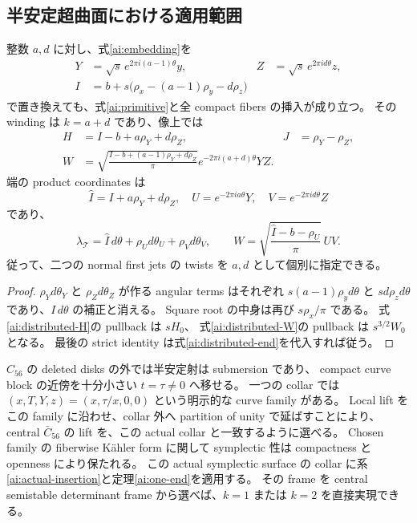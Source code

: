 \subsection{半安定超曲面における適用範囲}

\begin{proposition}
\label{ai:distributed}
整数 $a,d$ に対し、式\eqref{ai:embedding}を
\begin{equation}\label{ai:distributed-map}
\begin{aligned}
 Y&=\sqrt{s}\,e^{2\pi i(a-1)\theta}y,&
 Z&=\sqrt{s}\,e^{2\pi id\theta}z,\\
 I&=b+s\bigl(\rho_x-(a-1)\rho_y-d\rho_z\bigr)
\end{aligned}
\end{equation}
で置き換えても、式\eqref{ai:primitive}と全 compact fibers の挿入が成り立つ。
その winding は $k=a+d$ であり、像上では
\begin{align}
 H&=I-b+a\rho_Y+d\rho_Z,& J&=\rho_Y-\rho_Z,\label{ai:distributed-H}\\
 W&=\sqrt{\frac{I-b+(a-1)\rho_Y+d\rho_Z}{\pi}}
          e^{-2\pi i(a+d)\theta}YZ.\label{ai:distributed-W}
\end{align}
端の product coordinates は
\begin{equation}\label{ai:distributed-end}
 \widehat I=I+a\rho_Y+d\rho_Z,\quad
 U=e^{-2\pi ia\theta}Y,\quad V=e^{-2\pi id\theta}Z
\end{equation}
であり、
\[
 \lambda_{\mathcal T}=\widehat I\,d\theta+\rho_Ud\theta_U+\rho_Vd\theta_V,
 \qquad W=\sqrt{\frac{\widehat I-b-\rho_U}{\pi}}\,UV.
\]
従って、二つの normal first jets の twists を $a,d$ として個別に指定できる。
\end{proposition}

\begin{proof}
$\rho_Yd\theta_Y$ と $\rho_Zd\theta_Z$ が作る angular terms はそれぞれ
$s(a-1)\rho_y d\theta$ と $sd\rho_zd\theta$ であり、$I\,d\theta$ の補正と消える。
Square root の中身は再び $s\rho_x/\pi$ である。
式\eqref{ai:distributed-H}の pullback は $sH_0$、
式\eqref{ai:distributed-W}の pullback は $s^{3/2}W_0$ となる。
最後の strict identity は式\eqref{ai:distributed-end}を代入すれば従う。
\end{proof}

$C_{56}$ の deleted disks の外では半安定射は submersion であり、
compact curve block の近傍を十分小さい $t=\tau\ne0$ へ移せる。
一つの collar では $(x,T,Y,z)=(x,\tau/x,0,0)$ という明示的な curve family がある。
Local lift をこの family に沿わせ、collar 外へ partition of unity で延ばすことにより、
central $\bar C_{56}$ の lift を、この actual collar と一致するように選べる。
Chosen family の fiberwise K\"ahler form に関して symplectic 性は compactness と openness により保たれる。
この actual symplectic surface の collar に系\ref{ai:actual-insertion}と定理\ref{ai:one-end}を適用する。
その frame を central semistable determinant frame から選べば、$k=1$ または $k=2$ を直接実現できる。

